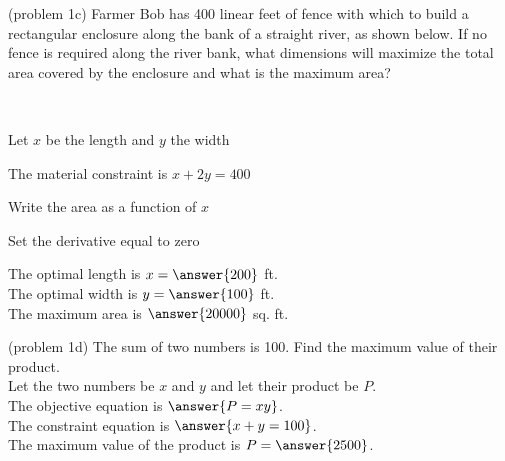 \documentclass{ximera}
\begin{document}
\begin{problem}(problem 1c)
Farmer Bob has 400 linear feet of fence with which to build a 
rectangular enclosure along the bank of a straight river, as shown below.  
If no fence is required along the river bank, what dimensions will maximize the total area 
covered by the enclosure and what is the maximum area?
\begin{center}
\\
\end{center}
\begin{hint}
Let $x$ be the length and $y$ the width
\end{hint}
\begin{hint}
The material constraint is $x+2y = 400$
\end{hint}
\begin{hint}
Write the area as a function of $x$
\end{hint}
\begin{hint}
Set the derivative equal to zero
\end{hint}

The optimal length is $x= \answer{200}$ ft.\\
The optimal width is $y = \answer{100}$ ft.\\
The maximum area is $\answer{20000}$ sq. ft.


\end{problem}


\begin{problem}(problem 1d)
The sum of two numbers is 100.  Find the maximum value of their product.\\
Let the two numbers be $x$ and $y$ and let their product be $P$.\\
The objective equation is $\answer{P=xy}$.\\
The constraint equation is $\answer{x + y = 100}$.\\
The maximum value of the product is $P= \answer{2500}$.
\end{problem}
\end{document}
